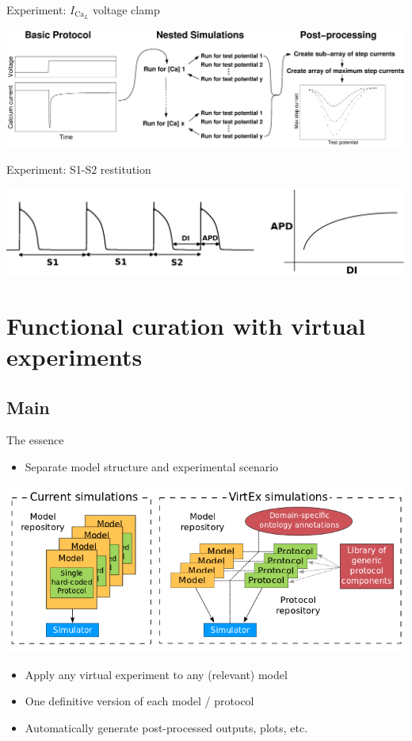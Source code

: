 \documentclass[t,xcolor={usenames,dvipsnames}]{beamer}
\newcommand{\subitem}[1]{\begin{itemize}[<.->]\item #1 \end{itemize}}
\begin{document}
\begin{frame}{Experiment: $I_{\textrm{Ca}_L}$ voltage clamp}
\begin{center}
\includegraphics[width=\textwidth]{ICaLIntro}
\end{center}
\end{frame}


\begin{frame}{Experiment: S1-S2 restitution}
\begin{center}
\includegraphics[width=\textwidth]{S1S2}
\end{center}
\end{frame}


\section{Functional curation with virtual experiments}
\subsection*{Main}

\begin{frame}{The essence}
\subitem{Separate \alert{model structure} and \alert{experimental scenario}}
\begin{center}
\includegraphics[width=.9\textwidth]{VirtEx_overview}
\end{center}
\begin{itemize}
\item Apply any \alert{virtual experiment} to any (relevant) model
\item One definitive version of each model / protocol
\item Automatically generate post-processed outputs, plots, etc.
\end{itemize}
\end{frame}
\end{document}
